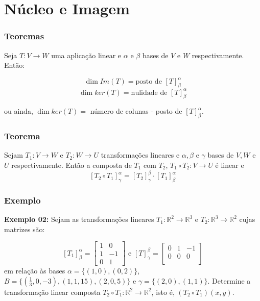 \documentclass[hyperref={pdfpagelabels=false}]{beamer}
\begin{document}
\section{Núcleo e Imagem}

\begin{frame}
\frametitle{Teoremas}

\begin{theorem}
	Seja $T:V \rightarrow W$ uma aplicação linear e $\alpha$ e $\beta$ bases de $V$ e $W$ respectivamente. Então:
	
	$$\dim Im(T) =  \text{posto de } [T]_{\beta}^{\alpha}$$
	$$\dim ker(T) = \text{nulidade de } [T]_{\beta}^{\alpha}$$
	
	ou ainda, $\dim ker(T) = $ número de colunas - posto de $[T]_{\beta}^{\alpha}$.
\end{theorem}

\end{frame}

\begin{frame}
\frametitle{Teorema}

\begin{theorem}
	Sejam $T_1 : V \rightarrow W$ e $T_2 : W \rightarrow U$ transformações lineares e $\alpha, \beta$ e $\gamma$ bases de $V, W$ e $U$ respectivamente. Então a composta de $T_1$ com $T_2$, $T_1 \circ T_2: V \rightarrow U$ é linear e
	$$[T_2 \circ T_1]_{\gamma}^{\alpha} = [T_2]_{\gamma}^{\beta} \cdot [T_1]_{\beta}^{\alpha}$$
	\vspace{100pt}
\end{theorem}


\end{frame}

\begin{frame}
\frametitle{Exemplo}

{\bf Exemplo 02: } Sejam as transformações lineares $T_1: \mathbb{R}^2 \rightarrow \mathbb{R}^3$ e $T_2: \mathbb{R}^3 \rightarrow \mathbb{R}^2$ cujas matrizes são:

$$[T_1]_{\beta}^{\alpha} = \left[
\begin{array}{cc}
1	&	0	\\
1	&	-1	\\
0	&	1
\end{array}
\right] 
\text{ e }
[T]_{\gamma}^{\beta} = \left[
\begin{array}{ccc}
0	&	1	&	-1	\\
0	&	0	&	0	\\
\end{array}
\right] 
$$
em relação às bases $\alpha = \{ (1,0), (0,2) \}$, $B = \{ (\frac{1}{3},0,-3), (1,1,15), (2,0,5) \}$ e $\gamma = \{ (2,0), (1,1) \}$. Determine a transformação linear composta $T_2 \circ T_1: \mathbb{R}^2 \rightarrow \mathbb{R}^2$, isto é, $(T_2 \circ T_1)(x,y)$.

\end{frame}
\end{document}
